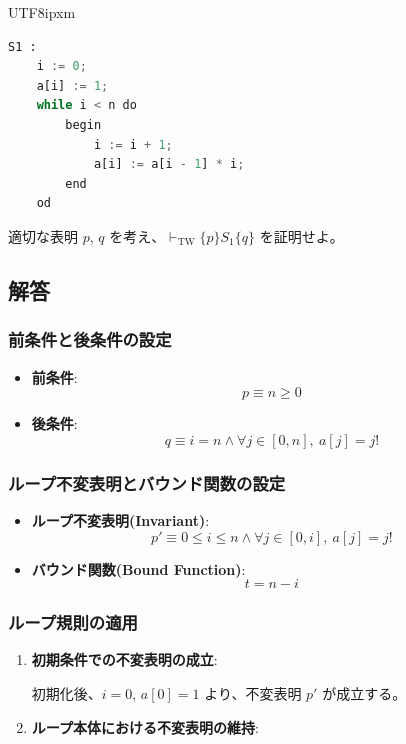 \documentclass[12pt,a4paper]{article}
\begin{document}
\begin{CJK}{UTF8}{ipxm}
\begin{lstlisting}[language=Python]
S1 :
    i := 0;
    a[i] := 1;
    while i < n do
        begin
            i := i + 1;
            a[i] := a[i - 1] * i;
        end
    od
\end{lstlisting}

適切な表明 $p$, $q$ を考え、$\vdash_{\text{TW}} \{ p \} S_1 \{ q \}$ を証明せよ。

\subsection*{解答}

\subsubsection*{前条件と後条件の設定}

\begin{itemize}
    \item \textbf{前条件}:
    \[
    p \equiv n \geq 0
    \]
    \item \textbf{後条件}:
    \[
    q \equiv i = n \land \forall j \in [0, n],\ a[j] = j!
    \]
\end{itemize}

\subsubsection*{ループ不変表明とバウンド関数の設定}

\begin{itemize}
    \item \textbf{ループ不変表明(Invariant)}:
    \[
    p' \equiv 0 \leq i \leq n \land \forall j \in [0, i],\ a[j] = j!
    \]
    \item \textbf{バウンド関数(Bound Function)}:
    \[
    t = n - i
    \]
\end{itemize}

\subsubsection*{ループ規則の適用}

\begin{enumerate}
    \item \textbf{初期条件での不変表明の成立}:

    初期化後、$i = 0$, $a[0] = 1$ より、不変表明 $p'$ が成立する。

    \item \textbf{ループ本体における不変表明の維持}:


\end{enumerate}
\end{CJK}
\end{document}
